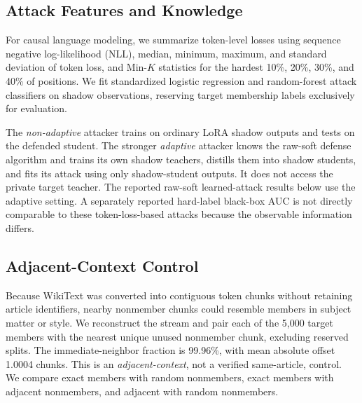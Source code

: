 \documentclass[conference]{IEEEtran}
\begin{document}
\subsection{Attack Features and Knowledge}
For causal language modeling, we summarize token-level losses using sequence negative log-likelihood (NLL), median, minimum, maximum, and standard deviation of token loss, and Min-$K$ statistics for the hardest 10\%, 20\%, 30\%, and 40\% of positions. We fit standardized logistic regression and random-forest attack classifiers on shadow observations, reserving target membership labels exclusively for evaluation.

The \emph{non-adaptive} attacker trains on ordinary LoRA shadow outputs and tests on the defended student. The stronger \emph{adaptive} attacker knows the raw-soft defense algorithm and trains its own shadow teachers, distills them into shadow students, and fits its attack using only shadow-student outputs. It does not access the private target teacher. The reported raw-soft learned-attack results below use the adaptive setting. A separately reported hard-label black-box AUC is not directly comparable to these token-loss-based attacks because the observable information differs.

\subsection{Adjacent-Context Control}
Because WikiText was converted into contiguous token chunks without retaining article identifiers, nearby nonmember chunks could resemble members in subject matter or style. We reconstruct the stream and pair each of the 5,000 target members with the nearest unique unused nonmember chunk, excluding reserved splits. The immediate-neighbor fraction is 99.96\%, with mean absolute offset 1.0004 chunks. This is an \emph{adjacent-context}, not a verified same-article, control. We compare exact members with random nonmembers, exact members with adjacent nonmembers, and adjacent with random nonmembers.
\end{document}
